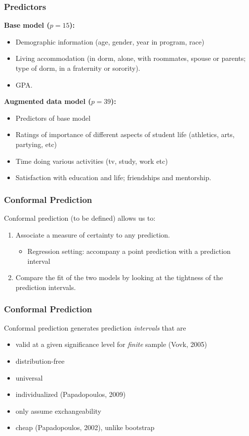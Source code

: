 \documentclass{beamer}
\begin{document}
\begin{frame} \frametitle{Predictors}
  
  \textbf{Base model ($p=15$):}
  \begin{itemize}
    \item Demographic information (age, gender, year in program, race)
    \item Living accommodation (in dorm, alone, with roommates, spouse or parents; type of dorm, in a fraternity or sorority).
    \item GPA.
  \end{itemize}
  
  \textbf{Augmented data model ($p=39$):}
  \begin{itemize}
    \item Predictors of base model
    \item Ratings of importance of different aspects of student life (athletics, arts, partying, etc)
    \item Time doing various activities (tv, study, work etc)
    \item Satisfaction with education and life; friendships and mentorship.
  \end{itemize}
  
\end{frame}


\begin{frame} \frametitle{Conformal Prediction}

  Conformal prediction (to be defined) allows us to:
  
  \begin{enumerate}
    \item Associate a measure of certainty to any prediction.
    \begin{itemize}
    	\item Regression setting: accompany a point prediction with a prediction interval
    \end{itemize}
    \item Compare the fit of the two models by looking at the tightness of the prediction intervals.
  \end{enumerate}

\end{frame}

\begin{frame} \frametitle{Conformal Prediction}

Conformal prediction generates prediction \textit{intervals} that are
\begin{itemize}
	\item valid at a given significance level for \textit{finite} sample (Vovk, 2005)
	\item distribution-free
	\item universal
	\item individualized (Papadopoulos, 2009)
	\item only assume exchangeability
	\item cheap (Papadopoulos, 2002), unlike bootstrap
\end{itemize}
\end{frame}
\end{document}
